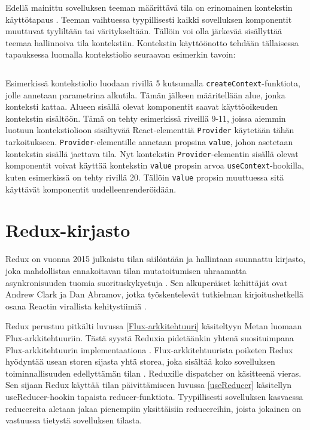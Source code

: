 Edellä mainittu sovelluksen teeman määrittävä tila on erinomainen kontekstin käyttötapaus \cite[112]{buglreacthooks}. Teeman vaihtuessa tyypillisesti kaikki sovelluksen komponentit muuttuvat tyyliltään tai väritykseltään. Tällöin voi olla järkevää sisällyttää teemaa hallinnoiva tila kontekstiin. Kontekstin käyttöönotto tehdään tällaisessa tapauksessa luomalla kontekstiolio seuraavan esimerkin tavoin:
\inputminted[bgcolor=black,highlightlines={5,9-11,20},highlightcolor=darkgray,samepage]{jsx.py:JsxLexer -x}{listaukset/usecontext.js}
Esimerkissä kontekstiolio luodaan rivillä 5 kutsumalla \texttt{createContext}-funktiota, jolle annetaan parametrina alkutila. Tämän jälkeen määritellään alue, jonka konteksti kattaa. Alueen sisällä olevat komponentit saavat käyttöoikeuden kontekstin sisältöön. Tämä on tehty esimerkissä riveillä 9-11, joissa aiemmin luotuun kontekstiolioon sisältyvää React-elementtiä \texttt{Provider} käytetään tähän tarkoitukseen. \texttt{Provider}-elementille annetaan propsina \texttt{value}, johon asetetaan kontekstin sisällä jaettava tila. Nyt kontekstin \texttt{Provider}-elementin sisällä olevat komponentit voivat käyttää kontekstin \texttt{value} propsin arvoa \texttt{useContext}-hookilla, kuten esimerkissä on tehty rivillä 20. Tällöin \texttt{value} propsin muuttuessa sitä käyttävät komponentit uudelleenrenderöidään. 


\section{Redux-kirjasto}
\label{Redux-kirjasto}

Redux on vuonna 2015 julkaistu tilan säilöntään ja hallintaan suunnattu kirjasto, joka mahdollistaa ennakoitavan tilan mutatoitumisen uhraamatta asynkronisuuden tuomia suorituskykyetuja \cite[8]{learningredux}. Sen alkuperäiset kehittäjät ovat Andrew Clark ja Dan Abramov, jotka työskentelevät tutkielman kirjoitushetkellä osana Reactin virallista kehitystiimiä \cite{reactdocsteam} \cite[183]{learningreact}.

Redux perustuu pitkälti luvussa \ref{Flux-arkkitehtuuri} käsiteltyyn Metan luomaan Flux-arkkitehtuuriin. Tästä syystä Reduxia pidetäänkin yhtenä suosituimpana Flux-arkkitehtuurin implementaationa \cite[183]{learningreact}. Flux-arkkitehtuurista poiketen Redux hyödyntää usean storen sijasta yhtä storea, joka sisältää koko sovelluksen toiminnallisuuden edellyttämän tilan \cite[13]{learningredux}. Reduxille dispatcher on käsitteenä vieras. Sen sijaan Redux käyttää tilan päivittämiseen luvussa \ref{useReducer} käsitellyn useReducer-hookin tapaista reducer-funktiota. Tyypillisesti sovelluksen kasvaessa reducereita aletaan jakaa pienempiin yksittäisiin reducereihin, joista jokainen on vastuussa tietystä sovelluksen tilasta. \cite[15]{learningredux} \cite{reduxdocsstore}


